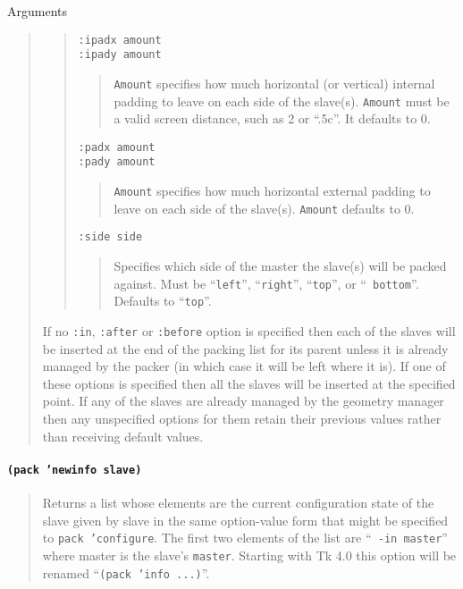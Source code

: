 \begin{schemedoc}{Arguments}
\begin{quote}
\begin{quote}
\par
{\tt :ipadx amount}\\
{\tt :ipady amount}
        \begin{quote}
         {\tt Amount} specifies how much horizontal (or vertical) 
         internal padding to leave on each side of the slave(s).  
         {\tt Amount} must be a valid screen  distance, such as 2 or
         ``.5c''. It defaults to 0.
        \end{quote}

\par
{\tt :padx amount}\\
{\tt :pady amount}  
        \begin{quote}
        {\tt Amount} specifies how much horizontal external
        padding to leave on each side of the slave(s).  {\tt Amount}
        defaults to 0.
        \end{quote}

\par
{\tt :side side}
        \begin{quote}
        Specifies which side of the master the slave(s) will be packed against.
        Must be ``{\tt left}'', ``{\tt right}'', ``{\tt top}'', or ``{\tt
        bottom}''.  Defaults to ``{\tt top}''.
        \end{quote}
\end{quote}
If no {\tt :in}, {\tt :after} or {\tt :before} option is specified then
each of the slaves will be inserted at the end of the packing list for its
parent unless it is already managed by the packer (in which case it will be
left where it is).  If one of these options is specified then all the
slaves will be inserted at the specified point.  If any of the slaves are
already managed by the geometry manager then any unspecified options for
them retain their previous values rather than receiving default values.
\end{quote}

\paragraph{\tt (pack 'newinfo slave)}
\begin{quote}
Returns a list whose elements are the current configuration state of the
slave given by slave in the same option-value form that might be specified
to {\tt pack 'configure}.  The first two elements of the list are ``{\tt
-in master}'' where master is the slave's {\tt master}.  Starting with Tk
4.0 this option will be renamed ``{\tt (pack 'info ...)}''.
\end{quote}


\end{schemedoc}
